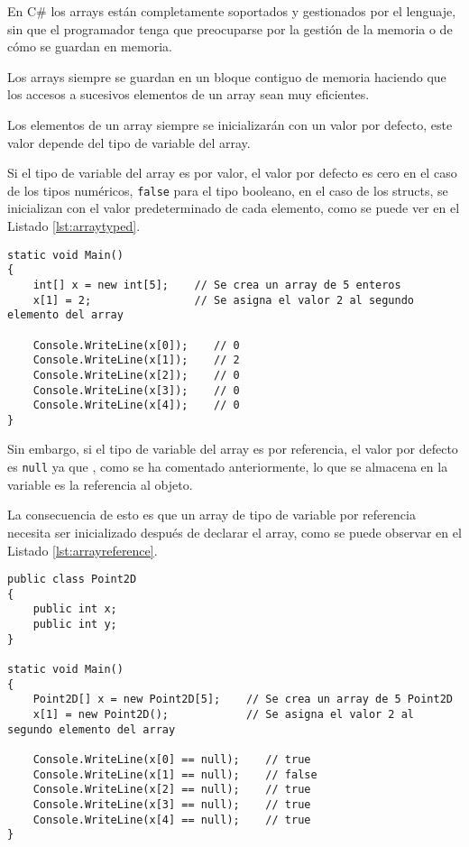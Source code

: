 \documentclass{pre-tfg}
\begin{document}
En C\# los arrays están completamente soportados y gestionados por el lenguaje, sin que el programador tenga que preocuparse por la gestión de la memoria o de cómo se guardan en memoria.

Los arrays siempre se guardan en un bloque contiguo de memoria haciendo que los accesos a sucesivos elementos de un array sean muy eficientes.

Los elementos de un array siempre se inicializarán con un valor por defecto, este valor depende del tipo de variable del array.

Si el tipo de variable del array es por valor, el valor por defecto es cero en el caso de los tipos numéricos, \texttt{false} para el tipo booleano, en el caso de los structs, se inicializan con el valor predeterminado de cada elemento, como se puede ver en el Listado \ref{lst:arraytyped}.

\begin{spacing}{1}
\begin{lstlisting}[float=htbp, caption=Ejemplo de array con tipo de variable por valor, label=lst:arraytyped]
static void Main()
{
	int[] x = new int[5];    // Se crea un array de 5 enteros
	x[1] = 2;				 // Se asigna el valor 2 al segundo elemento del array
		
	Console.WriteLine(x[0]);    // 0
	Console.WriteLine(x[1]);    // 2
	Console.WriteLine(x[2]);    // 0
	Console.WriteLine(x[3]);    // 0
	Console.WriteLine(x[4]);    // 0
}
\end{lstlisting}
\end{spacing}

Sin embargo, si el tipo de variable del array es por referencia, el valor por defecto es \texttt{null} ya que , como se ha comentado anteriormente, lo que se almacena en la variable es la referencia al objeto.

La consecuencia de esto es que un array de tipo de variable por referencia necesita ser inicializado después de declarar el array, como se puede observar en el Listado \ref{lst:arrayreference}.

\begin{spacing}{1}
\begin{lstlisting}[float=htbp, caption=Ejemplo de array con tipo de variable por referencia, label=lst:arrayreference]
public class Point2D 
{ 
	public int x;
	public int y;
}

static void Main()
{
	Point2D[] x = new Point2D[5];    // Se crea un array de 5 Point2D
	x[1] = new Point2D();			 // Se asigna el valor 2 al segundo elemento del array
		
	Console.WriteLine(x[0] == null);    // true
	Console.WriteLine(x[1] == null);    // false
	Console.WriteLine(x[2] == null);    // true
	Console.WriteLine(x[3] == null);    // true
	Console.WriteLine(x[4] == null);    // true
}
\end{lstlisting}
\end{spacing}
\end{document}
